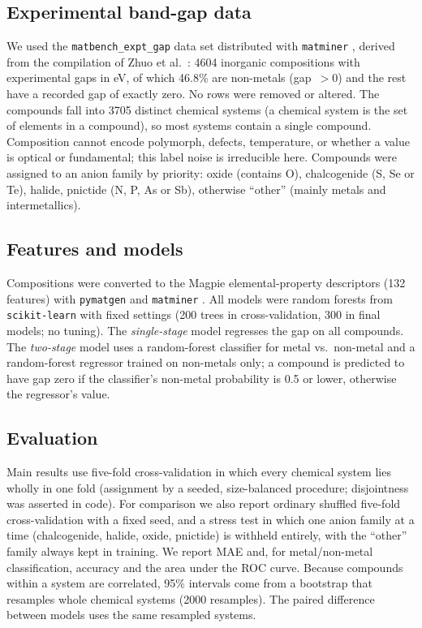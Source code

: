 \documentclass[11pt,a4paper]{article}
\begin{document}
\subsection{Experimental band-gap data}
We used the \texttt{matbench\_expt\_gap} data set distributed with \texttt{matminer} \cite{Ward2018matminer,Dunn2020}, derived from the compilation of Zhuo et al.\ \cite{Zhuo2018}:
4604 inorganic compositions with experimental gaps in eV, of which 46.8\% are non-metals (gap~$>0$) and the rest have a recorded gap of exactly zero. No rows were removed or altered.
The compounds fall into 3705 distinct chemical systems (a chemical system is the set of elements in a compound), so most systems contain a single compound. Composition cannot encode polymorph, defects,
temperature, or whether a value is optical or fundamental; this label noise is irreducible here. Compounds were assigned to an anion family by priority: oxide (contains O), chalcogenide (S, Se or Te), halide, pnictide (N, P, As or Sb), otherwise ``other'' (mainly metals and intermetallics).

\subsection{Features and models}
Compositions were converted to the Magpie elemental-property descriptors (132 features) with \texttt{pymatgen} and \texttt{matminer} \cite{Ong2013,Ward2018matminer,Ward2016}.
All models were random forests \cite{Breiman2001} from \texttt{scikit-learn} \cite{Pedregosa2011} with fixed settings (200 trees in cross-validation, 300 in final models; no tuning).
The \emph{single-stage} model regresses the gap on all compounds. The \emph{two-stage} model uses a random-forest classifier for metal vs.\ non-metal and a random-forest regressor trained on non-metals only;
a compound is predicted to have gap zero if the classifier's non-metal probability is 0.5 or lower, otherwise the regressor's value.

\subsection{Evaluation}
Main results use five-fold cross-validation in which every chemical system lies wholly in one fold (assignment by a seeded, size-balanced procedure; disjointness was asserted in code).
For comparison we also report ordinary shuffled five-fold cross-validation with a fixed seed, and a stress test in which one anion family at a time (chalcogenide, halide, oxide, pnictide) is withheld entirely, with the ``other'' family always kept in training.
We report MAE and, for metal/non-metal classification, accuracy and the area under the ROC curve. Because compounds within a system are correlated, 95\% intervals come from a bootstrap that resamples whole chemical systems (2000 resamples).
The paired difference between models uses the same resampled systems.
\end{document}
